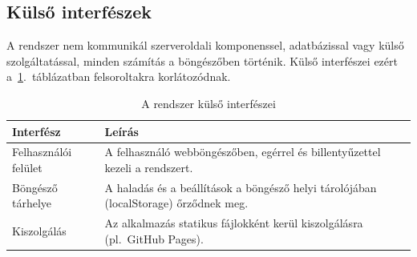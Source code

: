 \subsection{Külső interfészek}
A rendszer nem kommunikál szerveroldali komponenssel,
adatbázissal vagy külső szolgáltatással, minden számítás a
böngészőben történik.
Külső interfészei ezért a~\ref{tab:interfaces}.~táblázatban felsoroltakra korlátozódnak.
\begin{table}[H]
    \centering
    \begin{tabularx}{\textwidth}{|p{4.2cm}|X|}
        \hline
        \textbf{Interfész} & \textbf{Leírás} \\
        \hline
        Felhasználói felület &
        A felhasználó webböngészőben, egérrel és billentyűzettel
        kezeli a rendszert. \\ \hline
        Böngésző tárhelye &
        A haladás és a beállítások a böngésző helyi tárolójában
        (localStorage) őrződnek meg. \\ \hline
        Kiszolgálás &
        Az alkalmazás statikus fájlokként kerül kiszolgálásra
        (pl.\ GitHub Pages). \\
        \hline
    \end{tabularx}
    \caption{A rendszer külső interfészei}
    \label{tab:interfaces}
\end{table}

